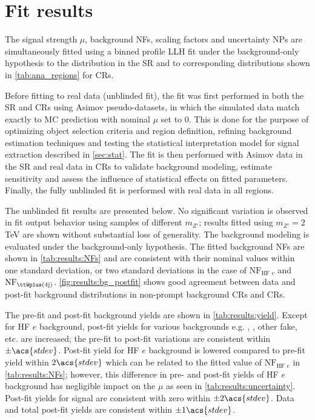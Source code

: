\documentclass[../thesis.tex]{subfiles}
\begin{document}
\section{Fit results}
\label{sec:results}

The signal strength $\mu$, background \acs{NF}s, \ttW scaling factors and uncertainty \acs{NP}s are simultaneously fitted using a binned profile \acs{LLH} fit under the background-only hypothesis to the \HT distribution in the \acs{SR} and to corresponding distributions shown in \autoref{tab:ana_regions} for \acs{CR}s. 

Before fitting to real data (unblinded fit), the fit was first performed in both the \acs{SR} and \acs{CR}s using Asimov pseudo-datasets, in which the simulated data match exactly to \acs{MC} prediction with nominal $\mu$ set to 0. This is done for the purpose of optimizing object selection criteria and region definition, refining background estimation techniques and testing the statistical interpretation model for signal extraction described in \autoref{sec:stat}. The fit is then performed with Asimov data in the \acs{SR} and real data in \acs{CR}s to validate background modeling, estimate sensitivity and assess the influence of statistical effects on fitted parameters. Finally, the fully unblinded fit is performed with real data in all regions.

The unblinded fit results are presented below. No significant variation is observed in fit output behavior using \ttZp samples of different $m_{Z'}$; results fitted using $m_{Z'}=2$ TeV are shown without substantial loss of generality. The background modeling is evaluated under the background-only hypothesis. The fitted background \acs{NF}s are shown in \autoref{tab:results:NFs} and are consistent with their nominal values within one standard deviation, or two standard deviations in the case of $\mathrm{NF}_{\text{HF }e}$ and $\mathrm{NF}_{\ttWplus(4\mathrm{j})}$. \autoref{fig:results:bg_postfit} shows good agreement between data and post-fit background distributions in non-prompt background \acs{CR}s and \ttW \acs{CR}s.

The pre-fit and post-fit background yields are shown in \autoref{tab:results:yield}. Except for HF $e$ background, post-fit yields for various backgrounds e.g. \tttt, \ttH, other fake, etc. are increased; the pre-fit to post-fit variations are consistent within $\pm \acs{stdev}$. Post-fit yield for \acs{HF} $e$ background is lowered compared to pre-fit yield within $2\acs{stdev}$ which can be related to the fitted value of $\text{NF}_{\text{HF }e}$ in \autoref{tab:results:NFs}; however, this difference in pre- and post-fit yields of HF $e$ background has negligible impact on the $\mu$ as seen in \autoref{tab:results:uncertainty}. Post-fit yields for signal are consistent with zero within $\pm2\acs{stdev}$. Data and total post-fit yields are consistent within $\pm 1\acs{stdev}$.
\end{document}
